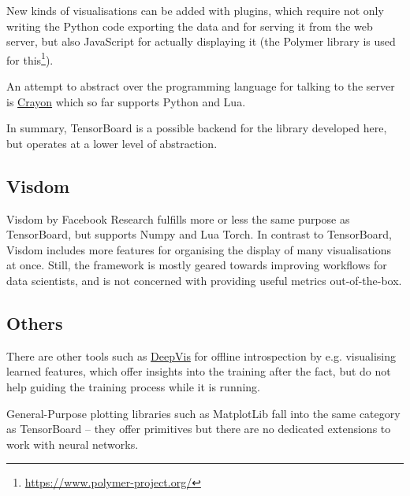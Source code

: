 New kinds of visualisations can be added with plugins, which require not
only writing the Python code exporting the data and for serving it from
the web server, but also JavaScript for actually displaying it (the
Polymer library is used for this\footnote{\url{https://www.polymer-project.org/}}).

An attempt to abstract over the programming language for talking to
the server is \href{https://github.com/torrvision/crayon}{Crayon} which
so far supports Python and Lua.

In summary, TensorBoard is a possible backend for the library developed here,
but operates at a lower level of abstraction.

\hypertarget{visdom}{%
\subsection*{Visdom}\label{visdom}}

Visdom by Facebook Research fulfills more or less the same purpose as
TensorBoard, but supports Numpy and Lua Torch. In contrast to
TensorBoard, Visdom includes more features for organising the display of
many visualisations at once. Still, the framework is mostly geared
towards improving workflows for data scientists, and is not concerned
with providing useful metrics out-of-the-box.

\hypertarget{others}{%
\subsection*{Others}\label{others}}

There are other tools such as \href{http://yosinski.com/deepvis}{DeepVis} for
offline introspection by e.g.  visualising learned features, which offer
insights into the training after the fact, but do not help guiding the training
process while it is running.

General-Purpose plotting libraries such as MatplotLib fall into the same
category as TensorBoard -- they offer primitives but there are no dedicated
extensions to work with neural networks.
